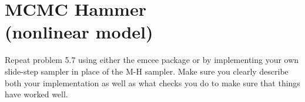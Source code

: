 \section{MCMC Hammer \\(nonlinear model)}

Repeat problem 5.7 using either the
emcee package or by implementing your own slide-step sampler in place of the M-H sampler.
Make sure you clearly describe both your implementation as well as what checks you do to make sure that things have worked well.